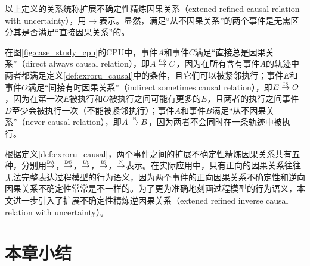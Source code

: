 以上定义的关系统称扩展不确定性精炼因果关系（extened refined causal relation with uncertainty），用$\rightarrow$表示。显然，满足“从不因果关系”的两个事件是无需区分其是否满足“直接因果关系”的。

\begin{example}\label{ex:exroru_causal}
在图\ref{fig:case_study_cpu}的CPU中，事件$A$和事件$C$满足“直接总是因果关系”（direct always causal relation），即$A\overset{\text{\tiny{DA}}}{\rightarrow}C$，因为在所有含有事件$A$的轨迹中两者都满足定义\ref{def:exroru_causal}中的条件，且它们可以被紧邻执行；事件$E$和事件$O$满足“间接有时因果关系”（indirect sometimes causal relation），即$E\overset{\text{\tiny{IS}}}{\rightarrow}O$，因为在第一次$E$被执行和$O$被执行之间可能有更多的$E$，且两者的执行之间事件$D$至少会被执行一次（不能被紧邻执行）；事件$A$和事件$B$满足“从不因果关系”（never causal relation），即$A\overset{\text{\tiny{N}}}{\rightarrow}B$，因为两者不会同时在一条轨迹中被执行。
\end{example}

根据定义\ref{def:exroru_causal}，两个事件之间的扩展不确定性精炼因果关系共有五种，分别用$\overset{\text{\tiny{DA}}}{\rightarrow}$，$\overset{\text{\tiny{DS}}}{\rightarrow}$，$\overset{\text{\tiny{IA}}}{\rightarrow}$，$\overset{\text{\tiny{IS}}}{\rightarrow}$，$\overset{\text{\tiny{N}}}{\rightarrow}$表示。在实际应用中，只有正向的因果关系往往无法完整表达过程模型的行为语义，因为两个事件的正向因果关系不确定性和逆向因果关系不确定性常常是不一样的。为了更为准确地刻画过程模型的行为语义，本文进一步引入了扩展不确定性精炼逆因果关系（extened refined inverse causal relation with uncertainty）。

\begin{definition}[事件间扩展不确定性精炼逆因果关系]\label{def:exroru_inverse_causal}

\end{definition}

\section{本章小结}